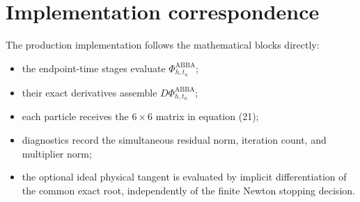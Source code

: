 \documentclass[11pt,a4paper]{article}
\newcommand{\PhiAB}{\Phi^{\mathrm{ABBA}}_{h,t_n}}
\begin{document}
\section{Implementation correspondence}

The production implementation follows the mathematical blocks directly:
\begin{itemize}
 \item the endpoint-time stages evaluate $\PhiAB$;
 \item their exact derivatives assemble $D\PhiAB$;
 \item each particle receives the $6\times6$ matrix in equation (21);
 \item diagnostics record the simultaneous residual norm, iteration count, and
       multiplier norm;
 \item the optional ideal physical tangent is evaluated by implicit differentiation
       of the common exact root, independently of the finite Newton stopping decision.
\end{itemize}
\end{document}
